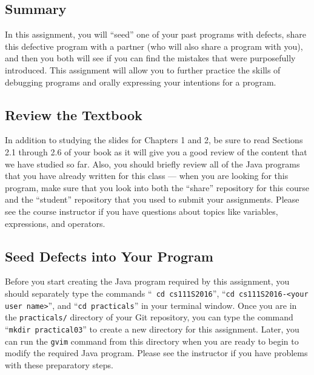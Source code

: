 


\vspace*{-.3in}
\subsection*{Summary}

In this assignment, you will ``seed'' one of your past programs with defects, share this defective program with a
partner (who will also share a program with you), and then you both will see if you can find the mistakes that were
purposefully introduced. This assignment will allow you to further practice the skills of debugging programs and orally
expressing your intentions for a program.

\vspace*{-.15in}
\subsection*{Review the Textbook}
\vspace*{-.075in}

In addition to studying the slides for Chapters 1 and 2, be sure to read Sections 2.1 through 2.6 of your book as it
will give you a good review of the content that we have studied so far. Also, you should briefly review all of the Java
programs that you have already written for this class --- when you are looking for this program, make sure that you look
into both the ``share'' repository for this course and the ``student'' repository that you used to submit your
assignments. Please see the course instructor if you have questions about topics like variables, expressions, and
operators.

\vspace*{-.15in}
\subsection*{Seed Defects into Your Program}
\vspace*{-.075in}

Before you start creating the Java program required by this assignment, you should separately type the commands ``{\tt
cd cs111S2016}'', ``{\tt cd cs111S2016-<your user name>}'', and ``{\tt cd practicals}'' in your terminal window. Once
you are in the {\tt practicals/} directory of your Git repository, you can type the command ``{\tt mkdir practical03}''
to create a new directory for this assignment. Later, you can run the {\tt gvim} command from this directory when you
are ready to begin to modify the required Java program. Please see the instructor if you have problems with these
preparatory steps.

